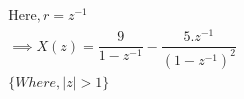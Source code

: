 \documentclass[journal,12pt,twocolumn]{IEEEtran}
\theoremstyle{remark}
\begin{document}
\begin{enumerate} [label=(\roman*)]
    \begin{align}
        &\text{Here}, r = z^{-1} \nonumber\\
        &\implies X(z) = \dfrac{9}{1-z^{-1}} - \dfrac{5.z^{-1}}{(1-z^{-1})^2}\\
        &\{ Where, |z|>1\} \nonumber
    \end{align}

\end{enumerate}
\end{document}
